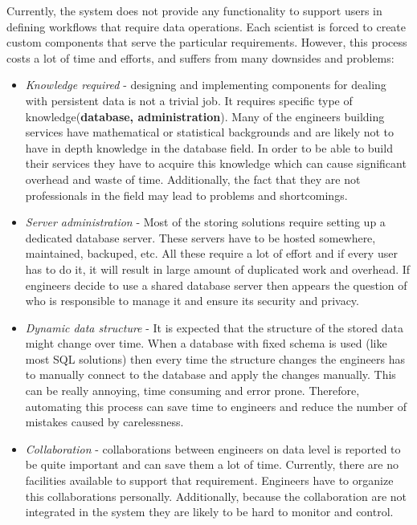 Currently, the system does not provide any functionality to support users in defining workflows that require data operations. Each scientist is forced to create custom components that serve the particular requirements. However, this process costs a lot of time and efforts, and suffers from many downsides and problems:

\begin{itemize}
	\item \textit{Knowledge required} - designing and implementing components for dealing with persistent data is not a trivial job. It requires specific type of knowledge(\textbf{database, administration}). Many of the engineers building services have mathematical or statistical backgrounds and are likely not to have in depth knowledge in the database field. In order to be able to build their services they have to acquire this knowledge which can cause significant overhead and waste of time. Additionally, the fact that they are not professionals in the field may lead to problems and shortcomings.
	
	\item \textit{Server administration} - Most of the storing solutions require setting up a dedicated database server. These servers have to be hosted somewhere, maintained, backuped, etc. All these require a lot of effort and if every user has to do it, it will result in large amount of duplicated work and overhead. If engineers decide to use a shared database server then appears the question of who is responsible to manage it and ensure its security and privacy.
	
	\item \textit{Dynamic data structure} - It is expected that the structure of the stored data might change over time. When a database with fixed schema is used (like most SQL solutions) then every time the structure changes the engineers has to manually connect to the database and apply the changes manually. This can be really annoying, time consuming and error prone. Therefore, automating this process can save time to engineers and reduce the number of mistakes caused by carelessness. 
	
	\item \textit{Collaboration} - collaborations between engineers on data level is reported to be quite important and can save them a lot of time. Currently, there are no facilities available to support that requirement. Engineers have to organize this collaborations personally. Additionally, because the collaboration are not integrated in the system they are likely to be hard to monitor and control.
	

\end{itemize}

